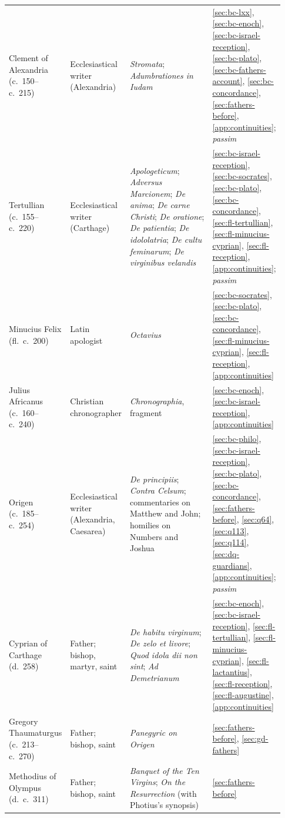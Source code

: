 \begin{longtable}{@{}>{\raggedright\arraybackslash}p{0.21\linewidth}>{\raggedright\arraybackslash}p{0.20\linewidth}>{\raggedright\arraybackslash}p{0.35\linewidth}>{\raggedright\arraybackslash}p{0.17\linewidth}@{}}
Clement of Alexandria (c.~150--c.~215) & Ecclesiastical writer (Alexandria) & \emph{Stromata}; \emph{Adumbrationes in Iudam} & \ref{sec:bc-lxx}, \ref{sec:bc-enoch}, \ref{sec:bc-israel-reception}, \ref{sec:bc-plato}, \ref{sec:bc-fathers-account}, \ref{sec:bc-concordance}, \ref{sec:fathers-before}, \ref{app:continuities}; \emph{passim}\\
Tertullian (c.~155--c.~220) & Ecclesiastical writer (Carthage) & \emph{Apologeticum}; \emph{Adversus Marcionem}; \emph{De anima}; \emph{De carne Christi}; \emph{De oratione}; \emph{De patientia}; \emph{De idololatria}; \emph{De cultu feminarum}; \emph{De virginibus velandis} & \ref{sec:bc-israel-reception}, \ref{sec:bc-socrates}, \ref{sec:bc-plato}, \ref{sec:bc-concordance}, \ref{sec:fl-tertullian}, \ref{sec:fl-minucius-cyprian}, \ref{sec:fl-reception}, \ref{app:continuities}; \emph{passim}\\
Minucius Felix (fl.~c.~200) & Latin apologist & \emph{Octavius} & \ref{sec:bc-socrates}, \ref{sec:bc-plato}, \ref{sec:bc-concordance}, \ref{sec:fl-minucius-cyprian}, \ref{sec:fl-reception}, \ref{app:continuities}\\
Julius Africanus (c.~160--c.~240) & Christian chronographer & \emph{Chronographia}, fragment & \ref{sec:bc-enoch}, \ref{sec:bc-israel-reception}, \ref{app:continuities}\\
Origen (c.~185--c.~254) & Ecclesiastical writer (Alexandria, Caesarea) & \emph{De principiis}; \emph{Contra Celsum}; commentaries on Matthew and John; homilies on Numbers and Joshua & \ref{sec:bc-philo}, \ref{sec:bc-israel-reception}, \ref{sec:bc-plato}, \ref{sec:bc-concordance}, \ref{sec:fathers-before}, \ref{sec:q64}, \ref{sec:q113}, \ref{sec:q114}, \ref{sec:dq-guardians}, \ref{app:continuities}; \emph{passim}\\
Cyprian of Carthage (d.~258) & Father; bishop, martyr, saint & \emph{De habitu virginum}; \emph{De zelo et livore}; \emph{Quod idola dii non sint}; \emph{Ad Demetrianum} & \ref{sec:bc-enoch}, \ref{sec:bc-israel-reception}, \ref{sec:fl-tertullian}, \ref{sec:fl-minucius-cyprian}, \ref{sec:fl-lactantius}, \ref{sec:fl-reception}, \ref{sec:fl-augustine}, \ref{app:continuities}\\
Gregory Thaumaturgus (c.~213--c.~270) & Father; bishop, saint & \emph{Panegyric on Origen} & \ref{sec:fathers-before}, \ref{sec:gd-fathers}\\
Methodius of Olympus (d.~c.~311) & Father; bishop, saint & \emph{Banquet of the Ten Virgins}; \emph{On the Resurrection} (with Photius's synopsis) & \ref{sec:fathers-before}\\

\end{longtable}
